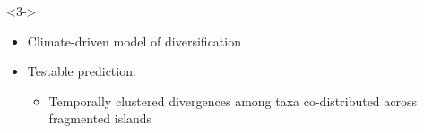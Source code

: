 {\begin{frame}
\begin{columns}
\begin{uncoverenv}
{\begin{minipage}[t][3.6cm][t]{1.1\textwidth}
                \begin{onlyenv}<3->
                \begin{itemize}
                    \item<3-> Climate-driven model of diversification
                    \item<4-> Testable prediction:
                    \begin{itemize}
                        \item Temporally clustered divergences among taxa
                            co-distributed across fragmented islands
                    \end{itemize}
                \end{itemize}
                \end{onlyenv}
            \end{minipage}
        }
    \end{uncoverenv}
    \end{columns}
\end{frame}
}



